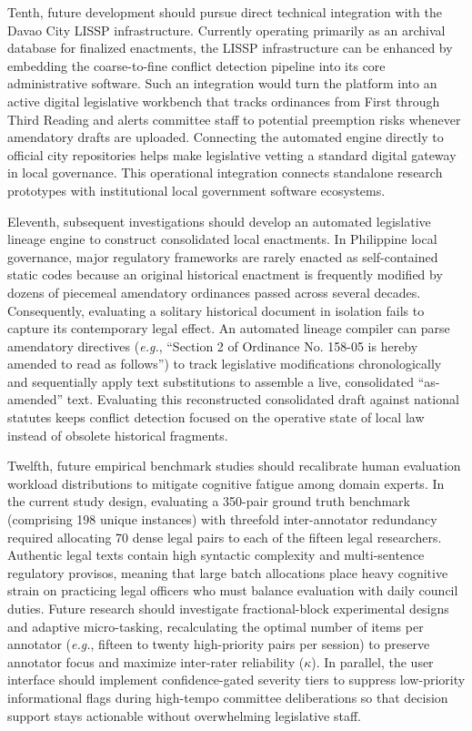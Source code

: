 Tenth, future development should pursue direct technical integration with the Davao City LISSP infrastructure. Currently operating primarily as an archival database for finalized enactments, the LISSP infrastructure can be enhanced by embedding the coarse-to-fine conflict detection pipeline into its core administrative software. Such an integration would turn the platform into an active digital legislative workbench that tracks ordinances from First through Third Reading and alerts committee staff to potential preemption risks whenever amendatory drafts are uploaded. Connecting the automated engine directly to official city repositories helps make legislative vetting a standard digital gateway in local governance. This operational integration connects standalone research prototypes with institutional local government software ecosystems.

Eleventh, subsequent investigations should develop an automated legislative lineage engine to construct consolidated local enactments. In Philippine local governance, major regulatory frameworks are rarely enacted as self-contained static codes because an original historical enactment is frequently modified by dozens of piecemeal amendatory ordinances passed across several decades. Consequently, evaluating a solitary historical document in isolation fails to capture its contemporary legal effect. An automated lineage compiler can parse amendatory directives (\textit{e.g.}, ``Section 2 of Ordinance No. 158-05 is hereby amended to read as follows'') to track legislative modifications chronologically and sequentially apply text substitutions to assemble a live, consolidated ``as-amended'' text. Evaluating this reconstructed consolidated draft against national statutes keeps conflict detection focused on the operative state of local law instead of obsolete historical fragments.

Twelfth, future empirical benchmark studies should recalibrate human evaluation workload distributions to mitigate cognitive fatigue among domain experts. In the current study design, evaluating a 350-pair ground truth benchmark (comprising 198 unique instances) with threefold inter-annotator redundancy required allocating 70 dense legal pairs to each of the fifteen legal researchers. Authentic legal texts contain high syntactic complexity and multi-sentence regulatory provisos, meaning that large batch allocations place heavy cognitive strain on practicing legal officers who must balance evaluation with daily council duties. Future research should investigate fractional-block experimental designs and adaptive micro-tasking, recalculating the optimal number of items per annotator (\textit{e.g.}, fifteen to twenty high-priority pairs per session) to preserve annotator focus and maximize inter-rater reliability ($\kappa$). In parallel, the user interface should implement confidence-gated severity tiers to suppress low-priority informational flags during high-tempo committee deliberations so that decision support stays actionable without overwhelming legislative staff.

